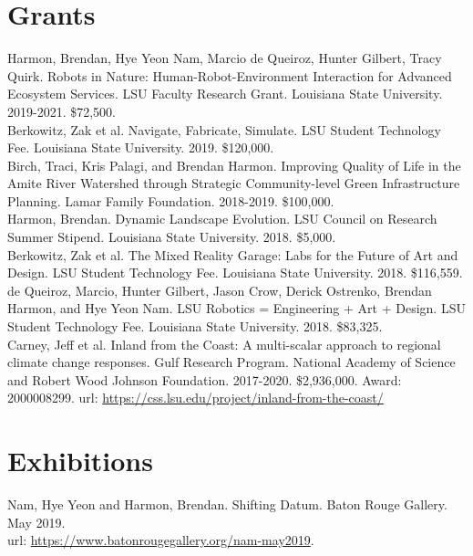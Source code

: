 \documentclass[]{baharmon_cv}
\begin{document}
\clearpage


\section{Grants} 

Harmon, Brendan, Hye Yeon Nam, Marcio de Queiroz, Hunter Gilbert, Tracy Quirk. Robots in Nature: Human-Robot-Environment Interaction for Advanced Ecosystem Services. LSU Faculty Research Grant. Louisiana State University. 2019-2021. \$72,500.\\

Berkowitz, Zak et al. Navigate, Fabricate, Simulate. LSU Student Technology Fee. Louisiana State University. 2019.	\$120,000.\\

Birch, Traci, Kris Palagi, and Brendan Harmon. Improving Quality of Life in the Amite River Watershed through Strategic Community-level Green Infrastructure Planning. Lamar Family Foundation. 2018-2019. \$100,000.\\

Harmon, Brendan. Dynamic Landscape Evolution. LSU Council on Research Summer Stipend. Louisiana State University. 2018. \$5,000.\\

Berkowitz, Zak et al. The Mixed Reality Garage: Labs for the Future of Art and Design. LSU Student Technology Fee. Louisiana State University. 2018. \$116,559.\\

de Queiroz, Marcio, Hunter Gilbert, Jason Crow, Derick Ostrenko, Brendan Harmon, and Hye Yeon Nam. LSU Robotics = Engineering + Art + Design. LSU Student Technology Fee. Louisiana State University. 2018. \$83,325.\\


Carney, Jeff et al. Inland from the Coast: A multi-scalar approach to regional climate change responses. Gulf Research Program. National Academy of Science and Robert Wood Johnson Foundation. 2017-2020. \$2,936,000. Award: 2000008299.
url: \url{https://css.lsu.edu/project/inland-from-the-coast/}\\


\sectiondivider \linebreak


\section{Exhibitions} 

Nam, Hye Yeon and Harmon, Brendan. Shifting Datum. Baton Rouge Gallery. May 2019.\\
url: \url{https://www.batonrougegallery.org/nam-may2019}.\\
\end{document}
